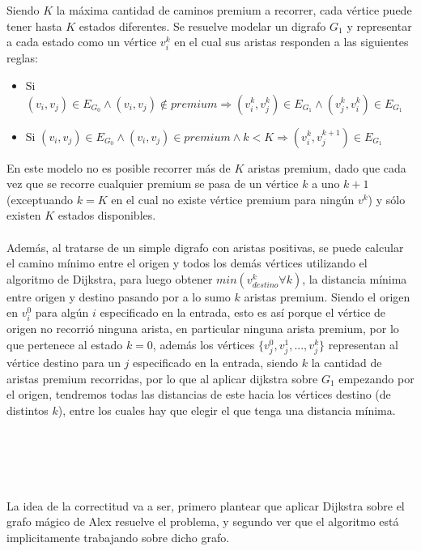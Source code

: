 Siendo $K$ la máxima cantidad de caminos premium a recorrer, cada vértice puede tener hasta $K$ estados diferentes. Se resuelve modelar un digrafo $G_1$ y representar a cada estado como un vértice $v_i^k$ en el cual sus aristas responden a las siguientes reglas:
\begin{itemize}
	\item Si $(v_i,v_j) \in E_{G_0} \land (v_i,v_j) \notin premium \Rightarrow (v_i^k,v_j^k) \in E_{G_1} \land (v_j^k,v_i^k) \in E_{G_1}$
	\item Si $(v_i,v_j) \in E_{G_0} \land (v_i,v_j) \in premium \land k < K \Rightarrow (v_i^k,v_j^{k+1}) \in E_{G_1}$
\end{itemize}
En este modelo no es posible recorrer más de $K$ aristas premium, dado que cada vez que se recorre cualquier premium se pasa de un vértice $k$ a uno $k+1$ (exceptuando $k=K$ en el cual no existe vértice premium para ningún $v^k$) y sólo existen $K$ estados disponibles.\\\\
Además, al tratarse de un simple digrafo con aristas positivas, se puede calcular el camino mínimo entre el origen y todos los demás vértices utilizando el algoritmo de Dijkstra, para luego obtener $min(v_{destino}^k \forall k)$, la distancia mínima entre origen y destino pasando por a lo sumo $k$ aristas premium. Siendo el origen en $v_i^0$ para algún $i$ especificado en la entrada, esto es así porque el vértice de origen no recorrió ninguna arista, en particular ninguna arista premium, por lo que pertenece al estado $k=0$, además los vértices $\{v_j^0,v_j^1,...,v_j^k\}$ representan al vértice destino para un $j$ especificado en la entrada, siendo $k$ la cantidad de aristas premium recorridas, por lo que al aplicar dijkstra sobre $G_1$ empezando por el origen, tendremos todas las distancias de este hacia los vértices destino (de distintos $k$), entre los cuales hay que elegir el que tenga una distancia mínima. \\\\\\\\\\\\



La idea de la correctitud va a ser, primero plantear que aplicar Dijkstra sobre el grafo mágico de Alex resuelve el problema, y segundo ver que el algoritmo está implicitamente trabajando sobre dicho grafo.

